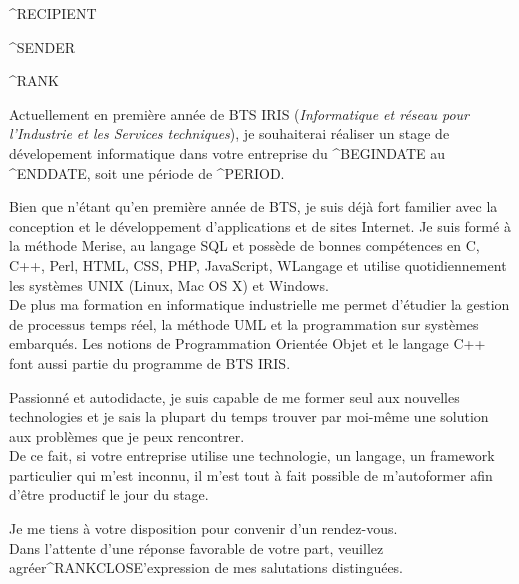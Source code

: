 \documentclass[a4paper,12pt]{lettre}
\begin{document}
\begin{letter}{^RECIPIENT}
  
^SENDER

\setlength{\sigspace}{-0.1cm}

\opening{^RANK}

Actuellement en première année de BTS IRIS (\emph{Informatique et réseau pour
l'Industrie et les Services techniques}), je souhaiterai réaliser un stage de
dévelopement informatique dans votre entreprise du ^BEGINDATE au ^ENDDATE, soit
une période de ^PERIOD.

Bien que n'étant qu'en première année de BTS, je suis déjà fort familier
avec la conception et le développement d'applications et de sites Internet.
Je suis formé à la méthode Merise, au langage SQL et possède de bonnes
compétences en C, C++, Perl, HTML, CSS, PHP, JavaScript, WLangage et utilise
quotidiennement les systèmes UNIX (Linux, Mac OS X) et Windows. \\[0.1\baselineskip]
%
\indent De plus ma formation en informatique industrielle me permet d'étudier
la gestion de processus temps réel, la méthode UML et la programmation sur
systèmes embarqués. Les notions de Programmation Orientée Objet et le langage
C++ font aussi partie du programme de BTS IRIS.

Passionné et autodidacte, je suis capable de me former seul aux nouvelles
technologies et je sais la plupart du temps trouver par moi-même une solution
aux problèmes que je peux rencontrer. \\[0.1\baselineskip]
\indent De ce fait, si votre entreprise utilise une technologie, un langage,
un framework particulier qui m'est inconnu, il m'est tout à fait possible de
m'autoformer afin d'être productif le jour du stage.

\closing{%
Je me tiens à votre disposition pour convenir d'un rendez-vous. \\
Dans l'attente d'une réponse favorable de votre part, veuillez
agréer^RANKCLOSE'expression de mes salutations distinguées.
}

\end{letter}
\end{document}
